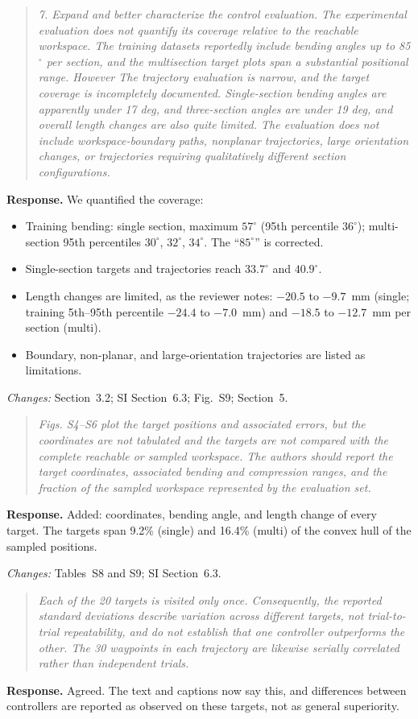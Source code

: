 \documentclass[11pt,a4paper]{article}
\newcommand{\rc}[1]{\begin{quote}\color{black!70}\itshape #1\end{quote}}
\begin{document}
\rc{7. Expand and better characterize the control evaluation. The experimental evaluation does not quantify its coverage relative to the reachable workspace. The training datasets reportedly include bending angles up to 85$^\circ$ per section, and the multisection target plots span a substantial positional range. However The trajectory evaluation is narrow, and the target coverage is incompletely documented. Single-section bending angles are apparently under 17 deg, and three-section angles are under 19 deg, and overall length changes are also quite limited. The evaluation does not include workspace-boundary paths, nonplanar trajectories, large orientation changes, or trajectories requiring qualitatively different section configurations.}
\textbf{Response.} We quantified the coverage:
\begin{itemize}
\item Training bending: single section, maximum $57^\circ$ (95th percentile $36^\circ$); multi-section 95th percentiles $30^\circ$, $32^\circ$, $34^\circ$. The ``$85^\circ$'' is corrected.
\item Single-section targets and trajectories reach $33.7^\circ$ and $40.9^\circ$.
\item Length changes are limited, as the reviewer notes: $-20.5$ to $-9.7$~mm (single; training 5th--95th percentile $-24.4$ to $-7.0$~mm) and $-18.5$ to $-12.7$~mm per section (multi).
\item Boundary, non-planar, and large-orientation trajectories are listed as limitations.
\end{itemize}

\textit{Changes:} Section~3.2; SI Section~6.3; Fig.~S9; Section~5.

\rc{Figs. S4--S6 plot the target positions and associated errors, but the coordinates are not tabulated and the targets are not compared with the complete reachable or sampled workspace. The authors should report the target coordinates, associated bending and compression ranges, and the fraction of the sampled workspace represented by the evaluation set.}
\textbf{Response.} Added: coordinates, bending angle, and length change of every target. The targets span 9.2\% (single) and 16.4\% (multi) of the convex hull of the sampled positions.

\textit{Changes:} Tables~S8 and S9; SI Section~6.3.

\rc{Each of the 20 targets is visited only once. Consequently, the reported standard deviations describe variation across different targets, not trial-to-trial repeatability, and do not establish that one controller outperforms the other. The 30 waypoints in each trajectory are likewise serially correlated rather than independent trials.}
\textbf{Response.} Agreed. The text and captions now say this, and differences between controllers are reported as observed on these targets, not as general superiority.
\end{document}
